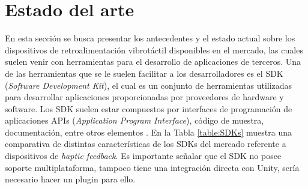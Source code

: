 \section{Estado del arte}

En esta sección se busca presentar los antecedentes y el estado actual sobre los dispositivos de retroalimentación vibrotáctil disponibles en el mercado, las cuales suelen venir con herramientas para el desarrollo de aplicaciones de terceros. Una de las herramientas que se le suelen facilitar a los desarrolladores es el SDK (\textit{Software Development Kit}), el cual es un conjunto de herramientas utilizadas para desarrollar aplicaciones proporcionadas por proveedores de hardware y software. Los SDK suelen estar compuestos por interfaces de programación de aplicaciones APIs (\textit{Application Program Interface}), código de muestra, documentación, entre otros elementos \citep{techopedia-SDK}. En la Tabla \ref{table:SDKs} muestra una comparativa de distintas características de los SDKs del mercado referente a dispositivos de \textit{haptic feedback}. Es importante señalar que el SDK no posee soporte multiplataforma, tampoco tiene una integración directa con Unity, sería necesario hacer un plugin para ello.

